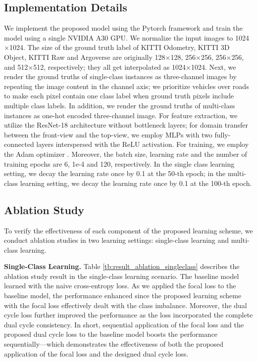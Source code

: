 \subsection{Implementation Details}
We implement the proposed model using the Pytorch framework and train the model using a single NVIDIA A30 GPU. We normalize the input images to 1024$\times$1024. The size of the ground truth label of KITTI Odometry, KITTI 3D Object, KITTI Raw and Argoverse are originally 128$\times$128, 256$\times$256, 256$\times$256, and 512$\times$512, respectively; they all get interpolated as 1024$\times$1024. Next, we render the ground truths of single-class instances as three-channel images by repeating the image content in the channel axis; we prioritize vehicles over roads to make each pixel contain one class label when ground truth pixels include multiple class labels. In addition, we render the ground truths of multi-class instances as one-hot encoded three-channel image. For feature extraction, we utilize the ResNet-18 architecture \cite{he2016deep} without bottleneck layers; for domain transfer between the front-view and the top-view, we employ MLPs with two fully-connected layers interspersed with the ReLU activation. For training, we employ the Adam optimizer \cite{kingma2015adam}. Moreover, the batch size, learning rate and the number of training epochs are 6, 1e-4 and 120, respectively. In the single class learning setting, we decay the learning rate once by 0.1 at the 50-th epoch; in the multi-class learning setting, we decay the learning rate once by 0.1 at the 100-th epoch. 
\subsection{Ablation Study}
To verify the effectiveness of each component of the proposed learning scheme, we conduct ablation studies in two learning settings: single-class learning and multi-class learning.

\textbf{Single-Class Learning.} Table \ref{tb:result_ablation_singleclass} describes the ablation study result in the single-class learning scenario. The baseline model learned with the naive cross-entropy loss. As we applied the focal loss to the baseline model, the performance enhanced since the proposed learning scheme with the focal loss effectively dealt with the class imbalance. Moreover, the dual cycle loss further improved the performance as the loss incorporated the complete dual cycle consistency. In short, sequential application of the focal loss and the proposed dual cycle loss to the baseline model boosts the performance sequentially---which demonstrates the effectiveness of both the proposed application of the focal loss and the designed dual cycle loss.

